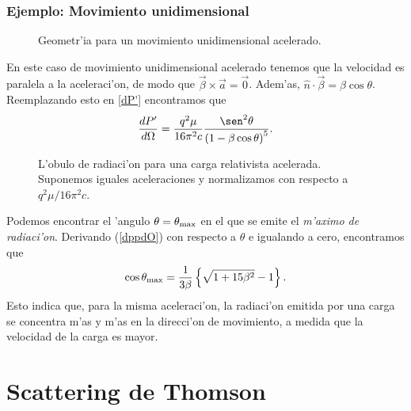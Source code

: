 \subsubsection{Ejemplo: Movimiento unidimensional}
\begin{figure}[!h]
\centerline{}
\caption{Geometr'ia para un movimiento unidimensional acelerado.}
\label{R14}
\end{figure}
En este caso de movimiento unidimensional acelerado tenemos que la velocidad es paralela a la aceleraci'on, de modo que $\vec{\beta}\times\vec{a}=\vec{0}$. Adem'as,
$\hat{n}\cdot\vec{\beta}=\beta\cos\theta$.
Reemplazando esto en \eqref{dP'} encontramos que 
\begin{equation}
\frac{dP'}{d\Omega}=\frac{q^2\mu}{16\pi^2 c}\frac{\sen^2
\theta}{\left(1-\beta\cos\theta\right)^5}. \label{dppdO}
\end{equation}
\begin{figure}[H]
\centerline{}
\caption{L'obulo de radiaci'on para una carga relativista acelerada. Suponemos
iguales aceleraciones y normalizamos con respecto a ${q^2\mu}/{16\pi^2 c}$.}
\label{lobulo02}
\end{figure}
Podemos encontrar el 'angulo $\theta=\theta_{\rm max}$ en el que se emite el
\textit{m'aximo de radiaci'on}. Derivando (\ref{dppdO}) con respecto a $\theta$ e
igualando a cero, encontramos que
\begin{equation}
\cos\theta_{\rm max}=\frac{1}{3\beta}\left\{  \sqrt{1+15\beta^2}-1\right\}  .
\end{equation}
Esto indica que, para la misma aceleraci'on, la radiaci'on emitida por una carga se concentra m'as y m'as en la direcci'on de movimiento, a medida que la velocidad de la carga es mayor.


\section{Scattering de Thomson}


